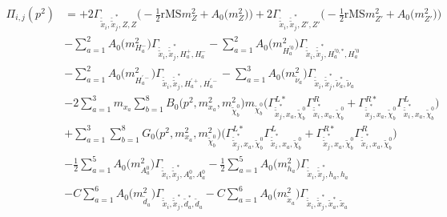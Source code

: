 \begin{itemize}
\begin{align} 
\Pi_{i,j}(p^2) &= +2 {\Gamma_{\check{\tilde{x}}_{{i}},\check{\tilde{x}}^*_{{j}},Z,Z}} \Big(-\frac{1}{2} \text{rMS} m^2_{Z}  + {A_0\Big(m^2_{Z}\Big)}\Big)+2 {\Gamma_{\check{\tilde{x}}_{{i}},\check{\tilde{x}}^*_{{j}},{Z'},{Z'}}} \Big(-\frac{1}{2} \text{rMS} m^2_{{Z'}}  + {A_0\Big(m^2_{{Z'}}\Big)}\Big)\nonumber \\ 
 &- \sum_{a=1}^{2}{A_0\Big(m^2_{H^-_{{a}}}\Big)} {\Gamma_{\check{\tilde{x}}_{{i}},\check{\tilde{x}}^*_{{j}},H^+_{{a}},H^-_{{a}}}}  - \sum_{a=1}^{2}{A_0\Big(m^2_{H^{'0}_{{a}}}\Big)} {\Gamma_{\check{\tilde{x}}_{{i}},\check{\tilde{x}}^*_{{j}},H^{{'0},*}_{{a}},H^{'0}_{{a}}}}  \nonumber \\ 
 &- \sum_{a=1}^{2}{A_0\Big(m^2_{H^{'-}_{{a}}}\Big)} {\Gamma_{\check{\tilde{x}}_{{i}},\check{\tilde{x}}^*_{{j}},H^{'+}_{{a}},H^{'-}_{{a}}}}  - \sum_{a=1}^{3}{A_0\Big(m^2_{\tilde{\nu}_{{a}}}\Big)} {\Gamma_{\check{\tilde{x}}_{{i}},\check{\tilde{x}}^*_{{j}},\tilde{\nu}^*_{{a}},\tilde{\nu}_{{a}}}}  \nonumber \\ 
 &-2 \sum_{a=1}^{3}m_{x_{{a}}} \sum_{b=1}^{8}{B_0\Big(p^{2},m^2_{x_{{a}}},m^2_{\tilde{\chi}^0_{{b}}}\Big)} m_{\tilde{\chi}^0_{{b}}} \Big({\Gamma^{L*}_{\check{\tilde{x}}^*_{{j}},x_{{a}},\tilde{\chi}^0_{{b}}}} {\Gamma^R_{\check{\tilde{x}}^*_{{i}},x_{{a}},\tilde{\chi}^0_{{b}}}}  + {\Gamma^{R*}_{\check{\tilde{x}}^*_{{j}},x_{{a}},\tilde{\chi}^0_{{b}}}} {\Gamma^L_{\check{\tilde{x}}^*_{{i}},x_{{a}},\tilde{\chi}^0_{{b}}}} \Big)  \nonumber \\ 
 &+\sum_{a=1}^{3}\sum_{b=1}^{8}{G_0\Big(p^{2},m^2_{x_{{a}}},m^2_{\tilde{\chi}^0_{{b}}}\Big)} \Big({\Gamma^{L*}_{\check{\tilde{x}}^*_{{j}},x_{{a}},\tilde{\chi}^0_{{b}}}} {\Gamma^L_{\check{\tilde{x}}^*_{{i}},x_{{a}},\tilde{\chi}^0_{{b}}}}  + {\Gamma^{R*}_{\check{\tilde{x}}^*_{{j}},x_{{a}},\tilde{\chi}^0_{{b}}}} {\Gamma^R_{\check{\tilde{x}}^*_{{i}},x_{{a}},\tilde{\chi}^0_{{b}}}} \Big)\nonumber \\ 
 &-\frac{1}{2} \sum_{a=1}^{5}{A_0\Big(m^2_{A^0_{{a}}}\Big)} {\Gamma_{\check{\tilde{x}}_{{i}},\check{\tilde{x}}^*_{{j}},A^0_{{a}},A^0_{{a}}}}  -\frac{1}{2} \sum_{a=1}^{5}{A_0\Big(m^2_{h_{{a}}}\Big)} {\Gamma_{\check{\tilde{x}}_{{i}},\check{\tilde{x}}^*_{{j}},h_{{a}},h_{{a}}}}  \nonumber \\ 
 &- C \sum_{a=1}^{6}{A_0\Big(m^2_{\tilde{d}_{{a}}}\Big)} {\Gamma_{\check{\tilde{x}}_{{i}},\check{\tilde{x}}^*_{{j}},\tilde{d}^*_{{a}},\tilde{d}_{{a}}}}  - C \sum_{a=1}^{6}{A_0\Big(m^2_{\tilde{x}_{{a}}}\Big)} {\Gamma_{\check{\tilde{x}}_{{i}},\check{\tilde{x}}^*_{{j}},\tilde{x}^*_{{a}},\tilde{x}_{{a}}}}  \nonumber \\ 

\end{align}
\end{itemize}
